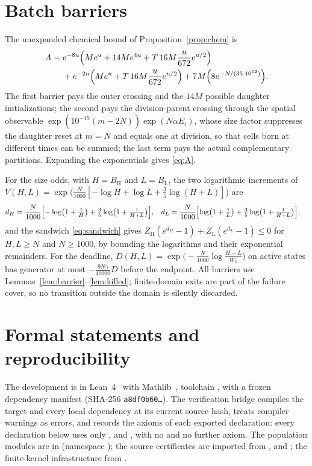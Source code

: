 \documentclass[11pt,a4paper]{article}
\theoremstyle{plain}
\theoremstyle{definition}
\theoremstyle{remark}
\newcommand{\lo}{\mathrm L}
\newcommand{\hi}{\mathrm H}
\begin{document}
\section{Batch barriers}\label{app:barriers}
The unexpanded chemical bound of Proposition~\ref{prop:chem} is
\begin{align*}
A={}&e^{-8u}\Bigl(Me^u+14Me^{4u}+T\,16M\frac u{672}e^{u/2}\Bigr)\\
&+e^{-2u}\Bigl(Me^u+T\,16M\frac u{672}e^{u/2}\Bigr)+7M\Bigl(8e^{-N/(35\cdot10^{12})}\Bigr).
\end{align*}
The first barrier pays the outer crossing and the $14M$ possible daughter initializations; the second pays the division-parent crossing through the spatial observable $\exp(10^{-15}(m-2N))\exp(N\alpha E_i)$, whose size factor suppresses the daughter reset at $m=N$ and equals one at division, so that cells born at different times can be summed; the last term pays the actual complementary partitions. Expanding the exponentials gives \eqref{eq:A}.

For the size odds, with $H=B_\hi$ and $L=B_\lo$, the two logarithmic increments of $V(H,L)=\exp\bigl(\frac N{1000}[-\log H+\log L+\frac35\log(H+L)]\bigr)$ are
\begin{align*}
d_H&=\frac N{1000}\Bigl[-\log\bigl(1+\tfrac1H\bigr)+\tfrac35\log\bigl(1+\tfrac1{H+L}\bigr)\Bigr],&
d_L&=\frac N{1000}\Bigl[\log\bigl(1+\tfrac1L\bigr)+\tfrac35\log\bigl(1+\tfrac1{H+L}\bigr)\Bigr],
\end{align*}
and the sandwich \eqref{eq:sandwich} gives $Z_\hi(e^{d_H}-1)+Z_\lo(e^{d_L}-1)\le0$ for $H,L\ge N$ and $N\ge1000$, by bounding the logarithms and their exponential remainders. For the deadline, $D(H,L)=\exp\bigl(-\frac N{1000}\log\frac{H+L}{W_0}\bigr)$ on active states has generator at most $-\frac{9N\gamma}{40000}D$ before the endpoint. All barriers use Lemmas~\ref{lem:barrier}--\ref{lem:killed}; finite-domain exits are part of the failure cover, so no transition outside the domain is silently discarded.

\section{Formal statements and reproducibility}\label{app:formal}
The development is in Lean~4~\citep{demoura2021} with Mathlib~\citep{mathlib2020}, toolchain , with a frozen dependency manifest (SHA-256 \texttt{a8df0b60\ldots}). The verification bridge compiles the target and every local dependency at its current source hash, treats compiler warnings as errors, and records the axioms of each exported declaration: every declaration below uses only ,  and , with no  and no further axiom. The population modules are in  (namespace ); the source certificates are imported from ,  and ; the finite-kernel infrastructure from .
\end{document}
